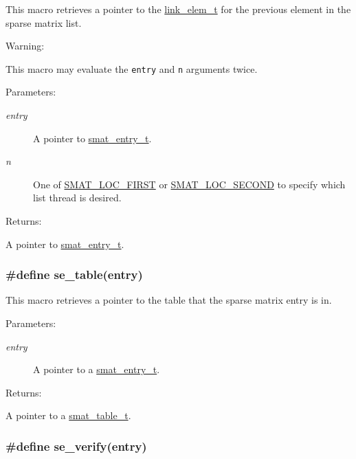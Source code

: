 This macro retrieves a pointer to the \hyperlink{group__dbprim__link_a1}{link\_\-elem\_\-t} for the previous element in the sparse matrix list.

\begin{Desc}
\item[Warning: ]\par
This macro may evaluate the {\tt entry} and {\tt n} arguments twice.\end{Desc}
\begin{Desc}
\item[Parameters: ]\par
\begin{description}
\item[{\em 
entry}]A pointer to \hyperlink{group__dbprim__smat_a2}{smat\_\-entry\_\-t}. \item[{\em 
n}]One of \hyperlink{group__dbprim__smat_a48a136}{SMAT\_\-LOC\_\-FIRST} or \hyperlink{group__dbprim__smat_a48a137}{SMAT\_\-LOC\_\-SECOND} to specify which list thread is desired.\end{description}
\end{Desc}
\begin{Desc}
\item[Returns: ]\par
A pointer to \hyperlink{group__dbprim__smat_a2}{smat\_\-entry\_\-t}. \end{Desc}
\hypertarget{group__dbprim__smat_a40}{
\subsubsection[se\_\-table]{\setlength{\rightskip}{0pt plus 5cm}\#define se\_\-table(entry)}}
\label{group__dbprim__smat_a40}


This macro retrieves a pointer to the table that the sparse matrix entry is in.\begin{Desc}
\item[Parameters: ]\par
\begin{description}
\item[{\em 
entry}]A pointer to a \hyperlink{group__dbprim__smat_a2}{smat\_\-entry\_\-t}.\end{description}
\end{Desc}
\begin{Desc}
\item[Returns: ]\par
A pointer to a \hyperlink{group__dbprim__smat_a0}{smat\_\-table\_\-t}. \end{Desc}
\hypertarget{group__dbprim__smat_a39}{
\subsubsection[se\_\-verify]{\setlength{\rightskip}{0pt plus 5cm}\#define se\_\-verify(entry)}}
\label{group__dbprim__smat_a39}


